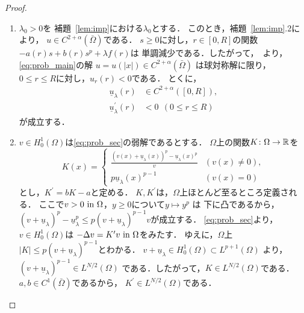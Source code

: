 \begin{proof}
 \begin{enumerate}[1.] \sage
  \item $\lambda_0 > 0$を
        補題~\ref{lem:imp}における$\lambda_0$とする．
        このとき，補題~\ref{lem:imp}.2により，
        $u \in C^{2+\alpha}(\bar{\Omega})$である．
        $s \geq 0$に対し，$r \in [0, R]$の関数
        $-a(r) s + b(r) s^p + \lambda f(r)$は
        単調減少である．したがって，\cite{MR544879}~より，
        \ref{eq:prob_main}の解
        $u = u(\lvert x \rvert) \in C^{2+\alpha}(\bar{\Omega})$
        は球対称解に限り，
        $0 \leq r \leq R$に対し，$u_r (r) < 0$である．
        とくに，
        \begin{align}
         \underline{u}_\lambda(r) & \in C^{2+ \alpha}([0, R]), 
          \label{eq:under_u_r} \\
         \underline{u}_\lambda^\prime(r) &< 0 \ \ (0 \leq r \leq R)
          \label{eq:under_u_r_prime}
        \end{align}
        が成立する．
  \item $v \in H_0^1(\Omega)$は\ref{eq:prob_sec}の弱解であるとする．
        $\Omega$上の関数$K \colon \Omega \to\mathbb{R}$を
        \begin{equation}
         K(x) = \begin{cases}
                 \displaystyle \frac{(v(x) + \underline{u}_\lambda(x))^p -
                 \underline{u}_\lambda(x)^p}{v} & ( v(x) \neq 0 ), \\
                 p \underline{u}_\lambda(x)^{p-1} & ( v(x) = 0 )
                \end{cases}
        \end{equation}
        とし，$K^\prime = b K - a$と定める．
        $K, K^\prime$は，$\Omega$上ほとんど至るところ定義される．
        ここで$v > 0 ~\text{in}~ \Omega$，$y \geq 0$について$y \mapsto y^p$
        は
        下に凸であるから，
        $(v + \underline{u}_\lambda)^p - \underline{u}_\lambda^p \leq
        p(v+ \underline{u}_\lambda)^{p-1} v$が成立する．
        \ref{eq:prob_sec}より，
        $v \in H_0^1(\Omega)$は
        $- \Delta v = K^\prime v ~\text{in}~ \Omega$をみたす．
        ゆえに，$\Omega$上$\lvert K \rvert \leq p
        (v+\underline{u}_\lambda)^{p-1}$とわかる．
        $v + \underline{u}_\lambda \in H_0^1(\Omega) \subset
        L^{p+1}(\Omega)$
        より，$(v + \underline{u}_\lambda)^{p-1} \in L^{N/2}(\Omega)$
        である．したがって，$K \in L^{N/2}(\Omega)$である．
        $a, b \in C^1(\bar{\Omega})$であるから，
        $K^\prime \in L^{N/2}(\Omega)$である．

\end{enumerate}
\end{proof}
